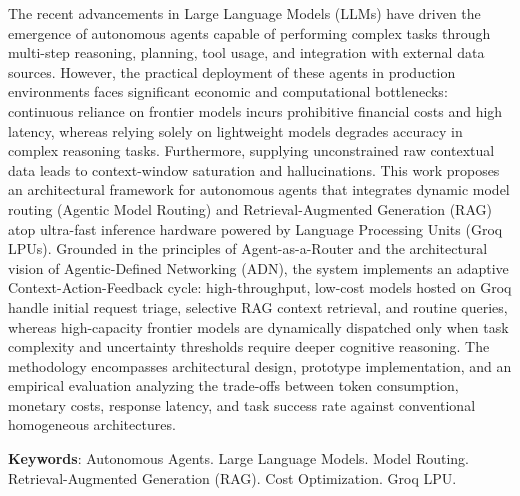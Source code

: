 \begin{resumo}[Abstract]
The recent advancements in Large Language Models (LLMs) have driven the emergence of autonomous agents capable of performing complex tasks through multi-step reasoning, planning, tool usage, and integration with external data sources. However, the practical deployment of these agents in production environments faces significant economic and computational bottlenecks: continuous reliance on frontier models incurs prohibitive financial costs and high latency, whereas relying solely on lightweight models degrades accuracy in complex reasoning tasks. Furthermore, supplying unconstrained raw contextual data leads to context-window saturation and hallucinations. This work proposes an architectural framework for autonomous agents that integrates dynamic model routing (Agentic Model Routing) and Retrieval-Augmented Generation (RAG) atop ultra-fast inference hardware powered by Language Processing Units (Groq LPUs). Grounded in the principles of Agent-as-a-Router and the architectural vision of Agentic-Defined Networking (ADN), the system implements an adaptive Context-Action-Feedback cycle: high-throughput, low-cost models hosted on Groq handle initial request triage, selective RAG context retrieval, and routine queries, whereas high-capacity frontier models are dynamically dispatched only when task complexity and uncertainty thresholds require deeper cognitive reasoning. The methodology encompasses architectural design, prototype implementation, and an empirical evaluation analyzing the trade-offs between token consumption, monetary costs, response latency, and task success rate against conventional homogeneous architectures.

\vspace{\onelineskip}

\noindent 
\textbf{Keywords}: Autonomous Agents. Large Language Models. Model Routing. Retrieval-Augmented Generation (RAG). Cost Optimization. Groq LPU.
\end{resumo}
